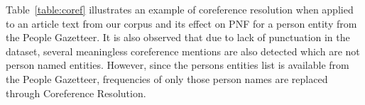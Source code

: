 Table~\ref{table:coref}  illustrates an example of coreference resolution when applied to an article text from our corpus and its effect on PNF for a person entity from the People Gazetteer. 
 It is also observed that due to lack of punctuation in the dataset, several meaningless coreference mentions are also detected which are not person named entities. However, since the persons entities list is available from the People Gazetteer, frequencies of only those person names are replaced through Coreference Resolution. 



